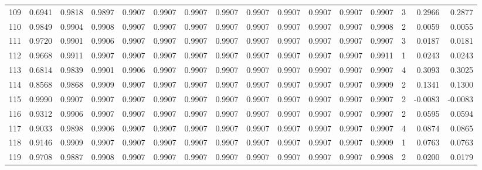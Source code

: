 \begin{tabular}{lrrrrrrrrrrrrrrr}
109 &      0.6941 &  0.9818 &  0.9897 &  0.9907 &  0.9907 &  0.9907 &  0.9907 &  0.9907 &  0.9907 &  0.9907 &   0.9907 &     0.9907 &      3 &                    0.2966 &                     0.2877 \\
110 &      0.9849 &  0.9904 &  0.9908 &  0.9907 &  0.9907 &  0.9907 &  0.9907 &  0.9907 &  0.9907 &  0.9907 &   0.9907 &     0.9908 &      2 &                    0.0059 &                     0.0055 \\
111 &      0.9720 &  0.9901 &  0.9906 &  0.9907 &  0.9907 &  0.9907 &  0.9907 &  0.9907 &  0.9907 &  0.9907 &   0.9907 &     0.9907 &      3 &                    0.0187 &                     0.0181 \\
112 &      0.9668 &  0.9911 &  0.9907 &  0.9907 &  0.9907 &  0.9907 &  0.9907 &  0.9907 &  0.9907 &  0.9907 &   0.9907 &     0.9911 &      1 &                    0.0243 &                     0.0243 \\
113 &      0.6814 &  0.9839 &  0.9901 &  0.9906 &  0.9907 &  0.9907 &  0.9907 &  0.9907 &  0.9907 &  0.9907 &   0.9907 &     0.9907 &      4 &                    0.3093 &                     0.3025 \\
114 &      0.8568 &  0.9868 &  0.9909 &  0.9907 &  0.9907 &  0.9907 &  0.9907 &  0.9907 &  0.9907 &  0.9907 &   0.9907 &     0.9909 &      2 &                    0.1341 &                     0.1300 \\
115 &      0.9990 &  0.9907 &  0.9907 &  0.9907 &  0.9907 &  0.9907 &  0.9907 &  0.9907 &  0.9907 &  0.9907 &   0.9907 &     0.9907 &      2 &                   -0.0083 &                    -0.0083 \\
116 &      0.9312 &  0.9906 &  0.9907 &  0.9907 &  0.9907 &  0.9907 &  0.9907 &  0.9907 &  0.9907 &  0.9907 &   0.9907 &     0.9907 &      2 &                    0.0595 &                     0.0594 \\
117 &      0.9033 &  0.9898 &  0.9906 &  0.9907 &  0.9907 &  0.9907 &  0.9907 &  0.9907 &  0.9907 &  0.9907 &   0.9907 &     0.9907 &      4 &                    0.0874 &                     0.0865 \\
118 &      0.9146 &  0.9909 &  0.9907 &  0.9907 &  0.9907 &  0.9907 &  0.9907 &  0.9907 &  0.9907 &  0.9907 &   0.9907 &     0.9909 &      1 &                    0.0763 &                     0.0763 \\
119 &      0.9708 &  0.9887 &  0.9908 &  0.9907 &  0.9907 &  0.9907 &  0.9907 &  0.9907 &  0.9907 &  0.9907 &   0.9907 &     0.9908 &      2 &                    0.0200 &                     0.0179 \\

\end{tabular}
